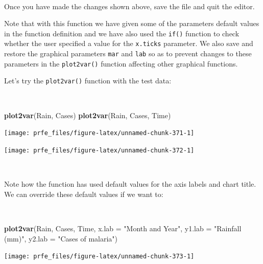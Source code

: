 \documentclass[12pt,a4paper]{book}
\newenvironment{Shaded}{\begin{snugshade}}{\end{snugshade}}
\newcommand{\DataTypeTok}[1]{\textcolor[rgb]{0.13,0.29,0.53}{#1}}
\newcommand{\KeywordTok}[1]{\textcolor[rgb]{0.13,0.29,0.53}{\textbf{#1}}}
\newcommand{\NormalTok}[1]{#1}
\newcommand{\StringTok}[1]{\textcolor[rgb]{0.31,0.60,0.02}{#1}}
\theoremstyle{definition}
\theoremstyle{definition}
\theoremstyle{definition}
\theoremstyle{remark}
\begin{document}
~

Once you have made the changes shown above, save the file and quit the
editor.

Note that with this function we have given some of the parameters
default values in the function definition and we have also used the
\texttt{if()} function to check whether the user specified a value for
the \texttt{x.ticks} parameter. We also save and restore the graphical
parameters \texttt{mar} and \texttt{lab} so as to prevent changes to
these parameters in the \texttt{plot2var()} function affecting other
graphical functions.

Let's try the \texttt{plot2var()} function with the test data:

~

\begin{Shaded}
\begin{Highlighting}[]
\KeywordTok{plot2var}\NormalTok{(Rain, Cases)}
\KeywordTok{plot2var}\NormalTok{(Rain, Cases, Time)}
\end{Highlighting}
\end{Shaded}

\begin{center}\texttt{[image: prfe\_files/figure-latex/unnamed-chunk-371-1]} \end{center}

\newpage

\begin{center}\texttt{[image: prfe\_files/figure-latex/unnamed-chunk-372-1]} \end{center}

~

Note how the function has used default values for the axis labels and
chart title. We can override these default values if we want to:

~

\begin{Shaded}
\begin{Highlighting}[]
\KeywordTok{plot2var}\NormalTok{(Rain, Cases, Time, }\DataTypeTok{x.lab =} \StringTok{"Month and Year"}\NormalTok{,}
         \DataTypeTok{y1.lab =} \StringTok{"Rainfall (mm)"}\NormalTok{, }\DataTypeTok{y2.lab =} \StringTok{"Cases of malaria"}\NormalTok{)}
\end{Highlighting}
\end{Shaded}

\begin{center}\texttt{[image: prfe\_files/figure-latex/unnamed-chunk-373-1]} \end{center}
\end{document}

